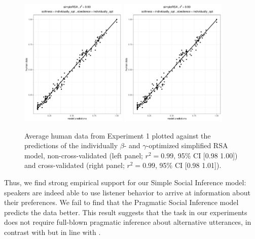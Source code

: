 \documentclass[10pt,a4paper]{article}
\begin{document}
\begin{figure}[ht]
	\centering
	\includegraphics[width=2in]{images/m5.pdf}
	\includegraphics[width=2in]{images/m8.pdf}
	\caption{Average human data from Experiment 1 plotted against the predictions of the individually $\beta$- and $\gamma$-optimized simplified RSA model, non-cross-validated (left panel; $r^{2}=0.99$, 95\% CI [0.98 1.00]) and cross-validated (right panel; $r^{2}=0.99$, 95\% CI [0.98 1.01]).}\label{cross-validation}
\end{figure}


Thus, we find strong empirical support for our Simple Social Inference model: speakers are indeed able to use listener behavior to arrive at information about their preferences. We fail to find that the Pragmatic Social Inference model predicts the data better. This result suggests that the task in our experiments does not require full-blown pragmatic inference about alternative utterances, in contrast with  but in line with . 
\end{document}

